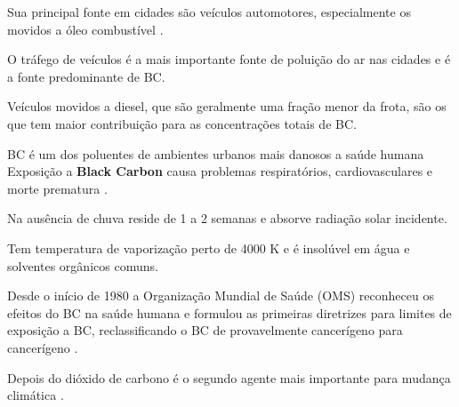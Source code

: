 Sua principal fonte em cidades são veículos automotores, 
especialmente os movidos a óleo combustível \citep{petzold2013}. 

O tráfego de veículos é a mais importante fonte de poluição do ar 
nas cidades e é a fonte predominante de BC. 

Veículos movidos a diesel, que são geralmente uma fração menor da frota, são 
os que tem maior contribuição para as concentrações totais de BC. 



BC é um dos poluentes de ambientes urbanos mais danosos a saúde humana 
Exposição a \textbf{Black Carbon} causa problemas respiratórios, 
cardiovasculares e morte prematura \citep{jacobson2014}.

Na ausência de chuva reside de 1 a 2 semanas e absorve radiação solar incidente.

Tem temperatura de vaporização perto de 4000 K e é insolúvel em água e 
solventes orgânicos comuns.

Desde o início de 1980 a Organização Mundial de Saúde (OMS)
reconheceu os efeitos do BC na saúde humana e formulou as primeiras diretrizes
para limites de exposição a BC, reclassificando o BC de 
provavelmente cancerígeno para cancerígeno \citep{petzold2013}.

Depois do dióxido de carbono é o segundo agente mais importante
para  mudança climática \citep{bond2013}.



